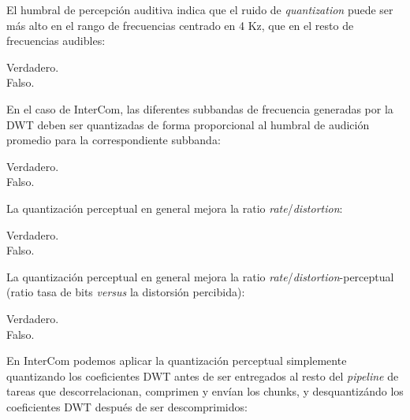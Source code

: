 \documentclass[legalpaper, 12pt, addpoints]{exam}
\begin{document}
\begin{questions}
\vspace{0.10in}

\question El humbral de percepción auditiva indica que el ruido de
\emph{quantization} puede ser más alto en el rango de frecuencias
centrado en 4 Kz, que en el resto de frecuencias audibles:

\begin{oneparchoices}
  \choice Verdadero.\\
  \choice Falso.
\end{oneparchoices}
  
\vspace{0.10in}

\question En el caso de InterCom, las diferentes subbandas de
frecuencia generadas por la DWT deben ser quantizadas de forma
proporcional al humbral de audición promedio para la correspondiente
subbanda:

\begin{oneparchoices}
  \choice Verdadero.\\
  \choice Falso.
\end{oneparchoices}
  
\vspace{0.10in}

\question La quantización perceptual en general mejora la ratio
\emph{rate}/\emph{distortion}:

\begin{oneparchoices}
  \choice Verdadero.\\
  \choice Falso.
\end{oneparchoices}
  
\vspace{0.10in}

\question La quantización perceptual en general mejora la ratio
\emph{rate}/\emph{distortion}-perceptual (ratio tasa de bits
\emph{versus} la distorsión percibida):

\begin{oneparchoices}
  \choice Verdadero.\\
  \choice Falso.
\end{oneparchoices}

\vspace{0.10in}

\question En InterCom podemos aplicar la quantización
perceptual simplemente quantizando los coeficientes DWT antes de
ser entregados al resto del \emph{pipeline} de tareas que
descorrelacionan, comprimen y envían los chunks, y desquantizándo
los coeficientes DWT después de ser descomprimidos:


\end{questions}
\end{document}
